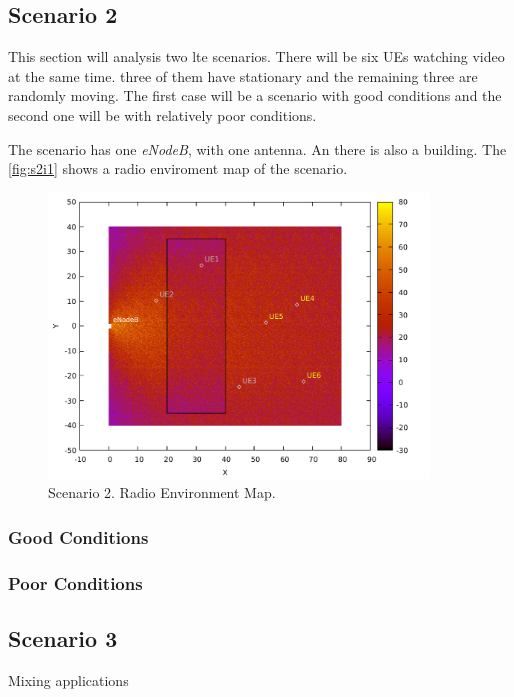 \subsection{Scenario 2}

This section will analysis two lte scenarios. There will be six UEs watching video at the same time.
three of them have stationary and the remaining three are randomly moving. The first case will be 
a scenario with good conditions and the second one will be with relatively poor conditions.

The scenario has one \textit{eNodeB}, with one antenna. An there is also a building. The 
\autoref{fig:s2i1} shows a radio enviroment map of the scenario.

\begin{figure}[h]
    \centering
    \includegraphics[width=0.9\textwidth]{img/s2i1.pdf}
    \caption{Scenario 2. Radio Environment Map.}
    \label{fig:s2i1}
\end{figure}

\subsubsection{Good Conditions}


\subsubsection{Poor Conditions}


\subsection{Scenario 3}

Mixing applications



